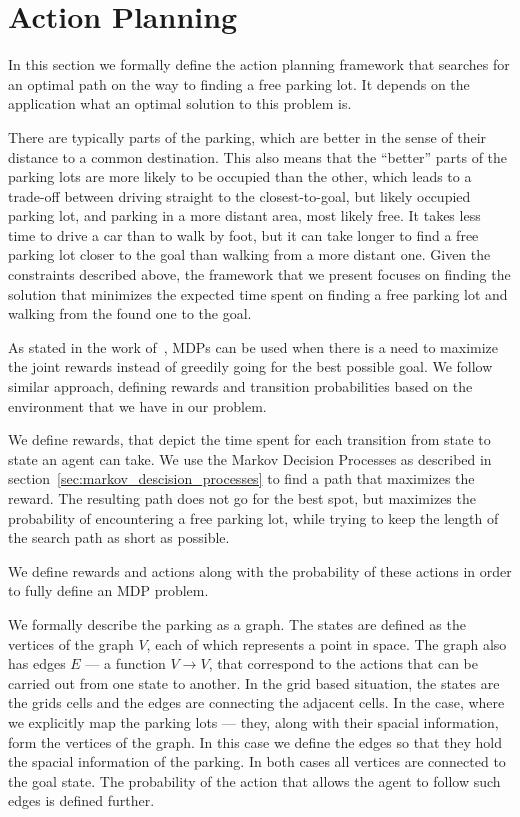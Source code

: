 
\section{Action Planning} %
\label{sec:action_planning}

    In this section we formally define the action planning framework that
    searches for an optimal path on the way to finding a free parking lot. It
    depends on the application what an optimal solution to this problem is.

    There are typically parts of the parking, which are better in the sense of
    their distance to a common destination. This also means that the
    ``better'' parts of the parking lots are more likely to be occupied than
    the other, which leads to a trade-off between driving straight to the
    closest-to-goal, but likely occupied parking lot, and parking in a more
    distant area, most likely free. It takes less time to drive a car than to
    walk by foot, but it can take longer to find a free parking lot closer to
    the goal than walking from a more distant one. Given the constraints
    described above, the framework that we present focuses on finding the
    solution that minimizes the expected time spent on finding a free parking
    lot and walking from the found one to the goal.

    As stated in the work of~\citet{tipaldiICRA11}, MDPs can be used when
    there is a need to maximize the joint rewards instead of greedily going
    for the best possible goal. We follow similar approach, defining rewards
    and transition probabilities based on the environment that we have in our
    problem.

    We define rewards, that depict the time spent for each transition from
    state to state an agent can take. We use the Markov Decision Processes as
    described in section~\ref{sec:markov_descision_processes} to find a path
    that maximizes the reward. The resulting path does not go for the best
    spot, but maximizes the probability of encountering a free parking lot,
    while trying to keep the length of the search path as short as possible.

    We define rewards and actions along with the probability of these actions
    in order to fully define an MDP problem.

    We formally describe the parking as a graph. The states are defined as the
    vertices of the graph $V$, each of which represents a point in space. The
    graph also has edges $E$ --- a function $V \rightarrow V$, that correspond
    to the actions that can be carried out from one state to another. In the
    grid based situation, the states are the grids cells and the edges are
    connecting the adjacent cells. In the case, where we explicitly map the
    parking lots --- they, along with their spacial information, form the
    vertices of the graph. In this case we define the edges so that they hold
    the spacial information of the parking. In both cases all vertices are
    connected to the goal state. The probability of the action that allows the
    agent to follow such edges is defined further.

